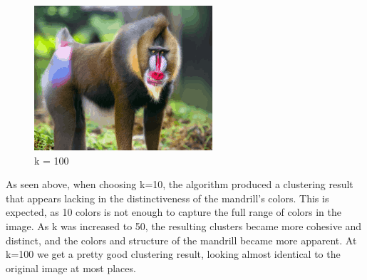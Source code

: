 \documentclass[12pt]{article}
\begin{document}
\begin{figure}[!h]
        \begin{minipage}{0.5\textwidth}
        \centering
        \includegraphics[]{images/monkey_clustered_kmeans_k_100}
        \caption{k = 100}
        \end{minipage}\label{fig:figure7}
	\end{figure}
    As seen above, when choosing k=10, the algorithm produced a clustering result that appears lacking in the distinctiveness of the mandrill's colors.
    This is expected, as 10 colors is not enough to capture the full range of colors in the image.
    As k was increased to 50, the resulting clusters became more cohesive and distinct, and the colors and structure of the mandrill became more apparent.
    At k=100 we get a pretty good clustering result, looking almost identical to the original image at most places.
    \pagebreak
\end{document}
